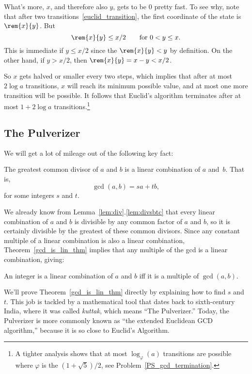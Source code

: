 What's more, $x$, and therefore also $y$, gets to be 0 pretty fast.  To see why, note that
after two transitions~\eqref{euclid_transition}, the first coordinate of the state is
$\rem{x}{y}$.  But
\begin{equation}\label{rxylx2}
\rem{x}{y} \le x/2 \qquad \text{for $0 < y \le x$}.
\end{equation}
This is immediate if $y \le x/2$ since the $\rem{x}{y}<y$ by definition.  On the other
hand, if $y > x/2$, then $\rem{x}{y} = x - y < x/2$.

So $x$ gets halved or smaller every two steps, which implies that after at most $2 \log a$
transitions, $x$ will reach its minimum possible value, and at most one more transition
will be possible.  It follows that Euclid's algorithm terminates after at most $1+2 \log a$
transitions.\footnote{A tighter analysis shows that at most $\log_\varphi(a)$ transitions
  are possible where $\varphi$ is the  $(1 + \sqrt{5})/2$, see
  Problem~\ref{PS_gcd_termination}.}

\subsection{The Pulverizer}\label{sec:pulverizer}
We will get a lot of mileage out of the following key fact:
\begin{theorem}\label{gcd_is_lin_thm}
The greatest common divisor of $a$ and $b$ is a linear combination of $a$ and~$b$.  That
is,
\[
\gcd(a, b) = s a + t b,
\]
for some integers $s$ and $t$.
\end{theorem}

We already know from Lemma~\ref{lem:div}.\ref{lem:divsbtc} that every linear combination of
$a$ and $b$ is divisible by any common factor of $a$ and $b$, so it is certainly divisible
by the greatest of these common divisors.  Since any constant multiple of a linear
combination is also a linear combination, Theorem~\ref{gcd_is_lin_thm} implies that any
multiple of the gcd is a linear combination, giving:
\begin{corollary}\label{cor:lin-comb}
An integer is a linear combination of $a$ and $b$ iff it is a multiple of $\gcd(a, b)$.
\end{corollary}

We'll prove Theorem~\ref{gcd_is_lin_thm} directly by explaining how to find $s$ and $t$.
This job is tackled by a mathematical tool that dates back to sixth-century India, where it
was called \emph{kuttak}, which means ``The Pulverizer.''  Today, the Pulverizer is more
commonly known as ``the extended Euclidean GCD algorithm,'' because it is so close to
Euclid's Algorithm.

